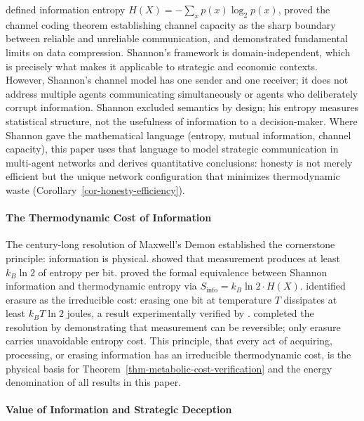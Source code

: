 \documentclass[11pt]{article}
\theoremstyle{plain}
\theoremstyle{definition}
\theoremstyle{remark}
\let\origparagraphcmd\paragraph
\renewcommand{\paragraph}{\needspace{3\baselineskip}\origparagraphcmd}
\begin{document}
\citet{Shannon1948} defined information entropy
\(H(X) = -\sum_x p(x) \log_2 p(x)\), proved the channel coding theorem
establishing channel capacity as the sharp boundary between reliable and
unreliable communication, and demonstrated fundamental limits on data
compression. Shannon's framework is domain-independent, which is
precisely what makes it applicable to strategic and economic contexts.
However, Shannon's channel model has one sender and one receiver; it
does not address multiple agents communicating simultaneously or agents
who deliberately corrupt information. Shannon excluded semantics by
design; his entropy measures statistical structure, not the usefulness
of information to a decision-maker. Where Shannon gave the mathematical
language (entropy, mutual information, channel capacity), this paper
uses that language to model strategic communication in multi-agent
networks and derives quantitative conclusions: honesty is not merely
efficient but the unique network configuration that minimizes
thermodynamic waste (Corollary~\ref{cor-honesty-efficiency}).

\paragraph{The Thermodynamic Cost of
Information}\label{the-thermodynamic-cost-of-information}

The century-long resolution of Maxwell's Demon established the
cornerstone principle: information is physical. \citet{Szilard1929}
showed that measurement produces at least \(k_B \ln 2\) of entropy per
bit. \citeauthor{Brillouin1951}
\citetext{\citeyear{Brillouin1951}; \citeyear{Brillouin1962}} proved the
formal equivalence between Shannon information and thermodynamic entropy
via \(S_{\text{info}} = k_B \ln 2 \cdot H(X)\). \citet{Landauer1961}
identified erasure as the irreducible cost: erasing one bit at
temperature \(T\) dissipates at least \(k_B T \ln 2\) joules, a result
experimentally verified by \citet{Berut2012}. \citeauthor{Bennett1973}
\citetext{\citeyear{Bennett1973}; \citeyear{Bennett1982}} completed the
resolution by demonstrating that measurement can be reversible; only
erasure carries unavoidable entropy cost. This principle, that every act
of acquiring, processing, or erasing information has an irreducible
thermodynamic cost, is the physical basis for
Theorem~\ref{thm-metabolic-cost-verification} and the energy
denomination of all results in this paper.

\paragraph{Value of Information and Strategic
Deception}\label{value-of-information-and-strategic-deception}
\end{document}
